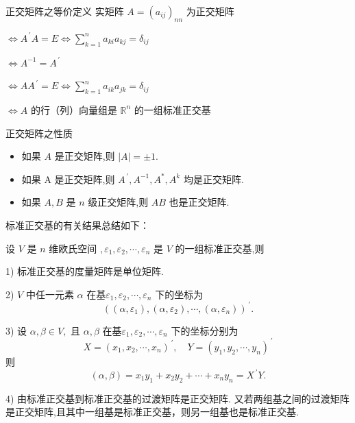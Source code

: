 \documentclass[13pt]{beamer}
\def\pf{{\bf 证明~~ }}
\def\Rn{\mathbb{R}^n}
\begin{document}
\begin{frame}{正交矩阵之等价定义}
\quad 实矩阵 $A=\left(a_{i j}\right)_{n n}$ 为正交矩阵 

 $\Leftrightarrow  {A}^{\, \prime} {A}={E}  \Leftrightarrow\sum_{k=1}^{n} a_{k i} a_{k j}=\delta_{i j} $
 
 $\Leftrightarrow A^{-1}=A^{\, \prime}$
 
$\Leftrightarrow A A^{\, \prime}=E \Leftrightarrow \sum_{k=1}^{n} a_{i k} a_{j k}=\delta_{i j}$

$\Leftrightarrow A$ 的行（列）向量组是 $\Rn$ 的一组标准正交基
\end{frame}


\begin{frame}{正交矩阵之性质}
\begin{itemize}
	\item 如果 $A$ 是正交矩阵,则 $|A|=\pm 1$.
	\item 如果 A 是正交矩阵,则 $A^{\, \prime}, A^{-1}, A^{*}, A^{k}$ 均是正交矩阵.
	\item 如果 $A, B$ 是 $n$ 级正交矩阵,则 $A B$ 也是正交矩阵.
\end{itemize}

\end{frame}

\begin{frame}
标准正交基的有关结果\alert{总结}如下：

设 $V$ 是 $n$ 维欧氏空间 $, \varepsilon_{1}, \varepsilon_{2}, \cdots, \varepsilon_{n}$ 是 $V$ 的一组标准正交基,则

1) 标准正交基的度量矩阵是单位矩阵.

2)  $V$ 中任一元素 $\alpha$ 在基$\varepsilon_{1}, \varepsilon_{2}, \cdots, \varepsilon_{n}$ 下的坐标为
\[
\left(\left(\alpha, \varepsilon_{1}\right),\left(\alpha, \varepsilon_{2}\right), \cdots,\left(\alpha, \varepsilon_{n}\right)\right)^{\, \prime}.
\]

3) 设 $\alpha, \beta \in V,$ 且 $\alpha, \beta$ 在基$\varepsilon_1, \varepsilon_{2}, \cdots, \varepsilon_{n}$ 下的坐标分别为
\[
X=\left(x_{1}, x_{2}, \cdots, x_{n}\right)^{\, \prime}, \quad Y=\left(y_{1}, y_{2}, \cdots, y_{n}\right)^{\, \prime}
\]
则
\[
(\alpha, \beta)=x_{1} y_{1}+x_{2} y_{2}+\cdots+x_{n} y_{n}=X^{\, \prime} Y.
\]

4) 由标准正交基到标准正交基的过渡矩阵是正交矩阵.
又若两组基之间的过渡矩阵是正交矩阵,且其中一组基是标准正交基，则另一组基也是标准正交基.
\end{frame}
\end{document}
